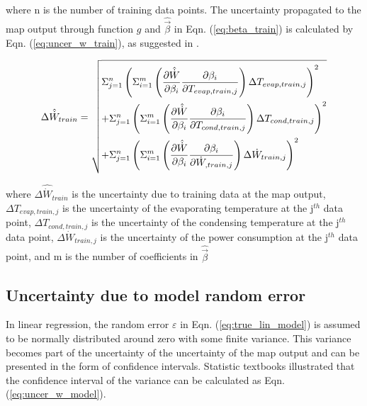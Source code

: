 where n is the number of training data points. The uncertainty propagated to the map output through function $g$ and $\hat{ \vec {\beta}}$ in Eqn. (\ref{eq:beta_train}) is calculated by Eqn. (\ref{eq:uncer_w_train}), as suggested in \cite{song:2013}.

\begin{equation}
\Delta {\hat{\dot{W}}_{train}} = \sqrt{\begin{gathered}
  \Sigma_{j=1}^n\left(\Sigma _{i = 1}^m\left(\frac{{\partial \hat{\dot{W}}}}{{\partial {\beta _i}}}\frac{{\partial {\beta _i}}}{{\partial {T_{evap,train,j}}}}\right)\Delta {T_{evap,train,j}}\right)^2  \hfill \\
  +\Sigma_{j=1}^n\left(\Sigma _{i = 1}^m\left(\frac{{\partial \hat{\dot{W}}}}{{\partial {\beta _i}}}\frac{{\partial {\beta _i}}}{{\partial {T_{cond,train,j}}}}\right)\Delta {T_{cond,train,j}}\right)^2 \hfill \\
   +\Sigma_{j=1}^n\left(\Sigma _{i = 1}^m\left(\frac{{\partial \hat{\dot{W}}}}{{\partial {\beta _i}}}\frac{{\partial {\beta _i}}}{{\partial {\dot{W}_{,train,j}}}}\right)\Delta {\dot{W}_{train,j}}\right)^2 \hfill \\ 
\end{gathered}}
\label{eq:uncer_w_train}
\end{equation}

where $\Delta {\hat{\dot{W}}_{train}}$ is the uncertainty due to training data at the map output, $\Delta {T_{evap,train,j}}$ is the uncertainty of the evaporating temperature at the j$^{th}$ data point, $\Delta {T_{cond,train,j}}$ is the uncertainty of the condensing temperature at the j$^{th}$ data point, $\Delta {\dot{W}_{train,j}}$ is the uncertainty of the power consumption at the j$^{th}$ data point, and m is the number of coefficients in $\hat{\vec{\beta}}$

\subsection{Uncertainty due to model random error} \label{subsec:uncer_model}

In linear regression, the random error $\varepsilon$ in Eqn. (\ref{eq:true_lin_model}) is assumed to be normally distributed around zero with some finite variance. This variance becomes part of the uncertainty of the uncertainty of the map output and can be presented in the form of confidence intervals. Statistic textbooks \cite{Montgomery:2005,Graybill:1994} illustrated that the confidence interval of the variance can be calculated as Eqn. (\ref{eq:uncer_w_model}).

